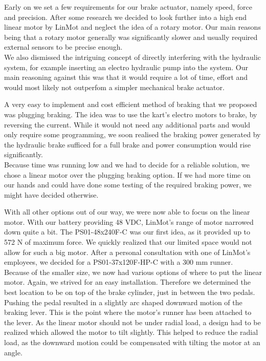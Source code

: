 Early on we set a few requirements for our brake actuator, namely speed, force and precision. After some research we decided to look further into a high end linear motor by LinMot and neglect the idea of a rotary motor. Our main reasons being that a rotary motor generally was significantly slower and usually required external sensors to be precise enough.\\
We also dismissed the intriguing concept of directly interfering with the hydraulic system, for example inserting an electro hydraulic pump into the system. Our main reasoning against this was that it would require a lot of time, effort and would most likely not outperfom a simpler mechanical brake actuator.

A very easy to implement and cost efficient method of braking that we proposed was plugging braking. The idea was to use the kart's electro motors to brake, by reversing the current. While it would not need any additional parts and would only require some programming, we soon realised the braking power generated by the hydraulic brake sufficed for a full brake and power consumption would rise significantly. \\Because time was running low and we had to decide for a reliable solution, we chose a linear motor over the plugging braking option. If we had more time on our hands and could have done some testing of the required braking power, we might have decided otherwise.

With all other options out of our way, we were now able to focus on the linear motor.
With our battery providing 48 VDC, LinMot's range of motor narrowed down quite a bit. The PS01-48x240F-C was our first idea, as it provided up to 572 N of maximum force. We quickly realized that our limited space would not allow for such a big motor. After a personal consultation with one of LinMot's employees, we decided for a PS01-37x120F-HP-C with a 300 mm runner.\\ Because of the smaller size, we now had various options of where to put the linear motor. Again, we strived for an easy installation. Therefore we determined the best location to be on top of the brake cylinder, just in between the two pedals. Pushing the pedal resulted in a slightly arc shaped downward motion of the braking lever. This is the point where the motor's runner has been attached to the lever. As the linear motor should not be under radial load, a design had to be realized which allowed the motor to tilt slightly. This helped to reduce the radial load, as the downward motion could be compensated with tilting the motor at an angle.

